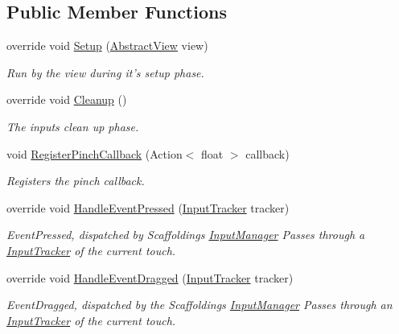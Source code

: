 \subsection*{Public Member Functions}
\begin{DoxyCompactItemize}
\item 
override void \hyperlink{class_scaffolding_1_1_pinch_input_aa6687d25d10c2f4e7106641e0647af35}{Setup} (\hyperlink{class_scaffolding_1_1_abstract_view}{Abstract\-View} view)
\begin{DoxyCompactList}\small\item\em Run by the view during it's setup phase. \end{DoxyCompactList}\item 
override void \hyperlink{class_scaffolding_1_1_pinch_input_a5849a64ba0a49d679e4a57fc28fe3f7a}{Cleanup} ()
\begin{DoxyCompactList}\small\item\em The inputs clean up phase. \end{DoxyCompactList}\item 
void \hyperlink{class_scaffolding_1_1_pinch_input_acaa10def18626148f344a8a50bdca22b}{Register\-Pinch\-Callback} (Action$<$ float $>$ callback)
\begin{DoxyCompactList}\small\item\em Registers the pinch callback. \end{DoxyCompactList}\item 
override void \hyperlink{class_scaffolding_1_1_pinch_input_aea53be8e94bef95c8373dd05639eaa41}{Handle\-Event\-Pressed} (\hyperlink{class_scaffolding_1_1_input_tracker}{Input\-Tracker} tracker)
\begin{DoxyCompactList}\small\item\em Event\-Pressed, dispatched by Scaffoldings \hyperlink{class_scaffolding_1_1_input_manager}{Input\-Manager} Passes through a \hyperlink{class_scaffolding_1_1_input_tracker}{Input\-Tracker} of the current touch. \end{DoxyCompactList}\item 
override void \hyperlink{class_scaffolding_1_1_pinch_input_a865f0201d2b7930241711abb68a7341d}{Handle\-Event\-Dragged} (\hyperlink{class_scaffolding_1_1_input_tracker}{Input\-Tracker} tracker)
\begin{DoxyCompactList}\small\item\em Event\-Dragged, dispatched by the Scaffoldings \hyperlink{class_scaffolding_1_1_input_manager}{Input\-Manager} Passes through an \hyperlink{class_scaffolding_1_1_input_tracker}{Input\-Tracker} of the current touch. \end{DoxyCompactList}\item 

\end{DoxyCompactItemize}
